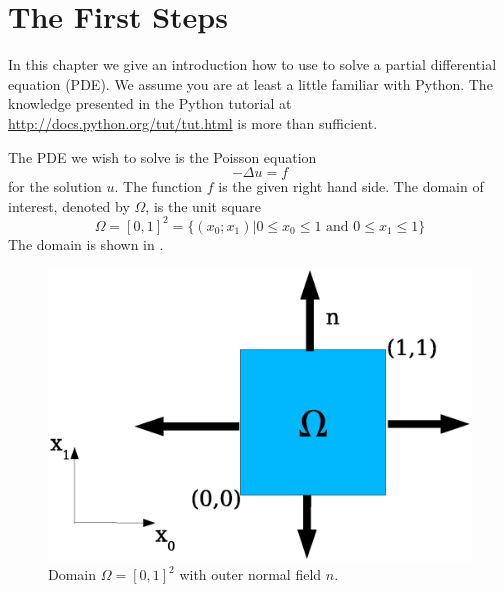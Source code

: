 
%
%
%


\section{The First Steps}\label{FirstSteps} 
In this chapter we give an introduction how to use \escript to solve 
a partial differential equation (PDE).
We assume you are at least a little familiar with Python.
The knowledge presented in the Python tutorial at \url{http://docs.python.org/tut/tut.html} is more than sufficient.

The PDE we wish to solve is the Poisson equation 
\begin{equation}
    -\Delta u=f 
    \label{eq:FirstSteps.1}
\end{equation}
for the solution $u$. The function $f$ is the given right hand side. The domain of interest, denoted by $\Omega$,
is the unit square 
\begin{equation}
\Omega=[0,1]^2=\{ (x_0;x_1) | 0\le x_{0} \le 1 \mbox{ and } 0\le x_{1} \le 1 \}
\label{eq:FirstSteps.1b}
\end{equation}
The domain is shown in .
\begin{figure}[ht]
    \centerline{\includegraphics{FirstStepDomain}}
    \caption{Domain $\Omega=[0,1]^2$ with outer normal field $n$.}
    \label{fig:FirstSteps.1}
\end{figure}

